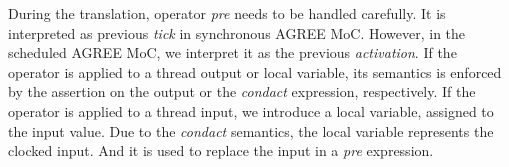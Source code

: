 During the translation, operator \emph{pre} needs to be handled carefully. It is interpreted as previous \emph{tick} in synchronous AGREE MoC. However, in the scheduled AGREE MoC, we interpret it as the previous \emph{activation}. If the operator is applied to a thread output or local variable, its semantics is enforced by the assertion on the output or the \emph{condact} expression, respectively. If the operator is applied to a thread input, we introduce a local variable, assigned to the input value. Due to the \emph{condact} semantics, the local variable represents the clocked input. And it is used to replace the input in a \emph{pre} expression.


  

